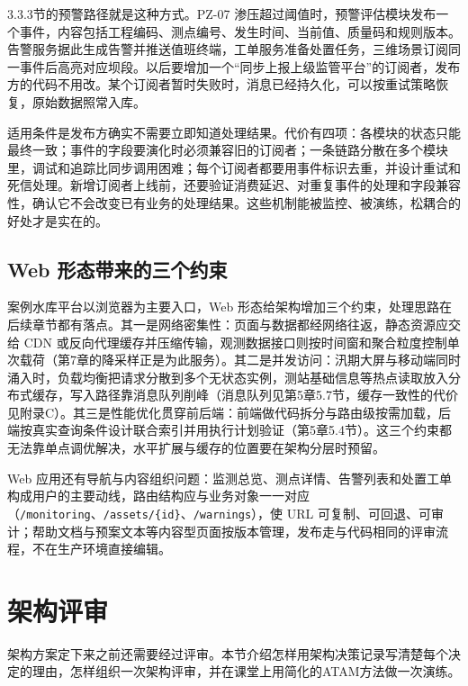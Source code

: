 3.3.3节的预警路径就是这种方式。PZ-07 渗压超过阈值时，预警评估模块发布一个事件，内容包括工程编码、测点编号、发生时间、当前值、质量码和规则版本。告警服务据此生成告警并推送值班终端，工单服务准备处置任务，三维场景订阅同一事件后高亮对应坝段。以后要增加一个“同步上报上级监管平台”的订阅者，发布方的代码不用改。某个订阅者暂时失败时，消息已经持久化，可以按重试策略恢复，原始数据照常入库。

适用条件是发布方确实不需要立即知道处理结果。代价有四项：各模块的状态只能最终一致；事件的字段要演化时必须兼容旧的订阅者；一条链路分散在多个模块里，调试和追踪比同步调用困难；每个订阅者都要用事件标识去重，并设计重试和死信处理。新增订阅者上线前，还要验证消费延迟、对重复事件的处理和字段兼容性，确认它不会改变已有业务的处理结果。这些机制能被监控、被演练，松耦合的好处才是实在的。

\subsection{Web 形态带来的三个约束}

案例水库平台以浏览器为主要入口，Web 形态给架构增加三个约束，处理思路在后续章节都有落点。其一是网络密集性：页面与数据都经网络往返，静态资源应交给 CDN 或反向代理缓存并压缩传输，观测数据接口则按时间窗和聚合粒度控制单次载荷（第7章的降采样正是为此服务）。其二是并发访问：汛期大屏与移动端同时涌入时，负载均衡把请求分散到多个无状态实例，测站基础信息等热点读取放入分布式缓存，写入路径靠消息队列削峰（消息队列见第5章5.7节，缓存一致性的代价见附录C）。其三是性能优化贯穿前后端：前端做代码拆分与路由级按需加载，后端按真实查询条件设计联合索引并用执行计划验证（第5章5.4节）。这三个约束都无法靠单点调优解决，水平扩展与缓存的位置要在架构分层时预留。

Web 应用还有导航与内容组织问题：监测总览、测点详情、告警列表和处置工单构成用户的主要动线，路由结构应与业务对象一一对应（\texttt{/monitoring}、\texttt{/assets/\{id\}}、\texttt{/warnings}），使 URL 可复制、可回退、可审计；帮助文档与预案文本等内容型页面按版本管理，发布走与代码相同的评审流程，不在生产环境直接编辑。

\section{架构评审}\label{sec:ch03-review}

架构方案定下来之前还需要经过评审。本节介绍怎样用架构决策记录写清楚每个决定的理由，怎样组织一次架构评审，并在课堂上用简化的ATAM方法做一次演练。

